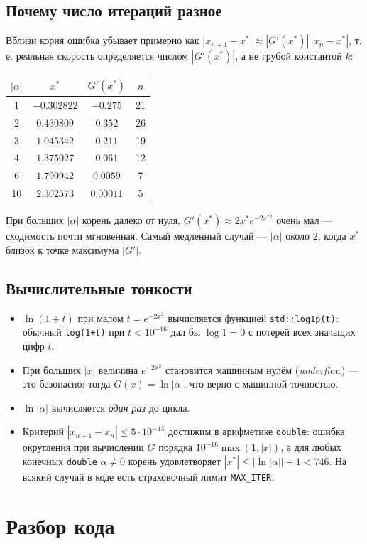 \documentclass[11pt,a4paper]{article}
\begin{document}
\subsection{Почему число итераций разное}
Вблизи корня ошибка убывает примерно как $|x_{n+1}-x^*|\approx|G'(x^*)|\,|x_n-x^*|$, т.\,е. реальная скорость определяется числом $|G'(x^*)|$, а не грубой константой $k$:
\begin{center}
\begin{tabular}{c|c|c|c}
$|\alpha|$ & $x^*$ & $G'(x^*)$ & $n$\\\hline
1 & $-0.302822$ & $-0.275$ & 21\\
2 & $0.430809$ & $0.352$ & 26\\
3 & $1.045342$ & $0.211$ & 19\\
4 & $1.375027$ & $0.061$ & 12\\
6 & $1.790942$ & $0.0059$ & 7\\
10 & $2.302573$ & $0.00011$ & 5
\end{tabular}
\end{center}
При больших $|\alpha|$ корень далеко от нуля, $G'(x^*)\approx 2x^*e^{-2x^{*2}}$ очень мал — сходимость почти мгновенная.
Самый медленный случай — $|\alpha|$ около $2$, когда $x^*$ близок к точке максимума $|G'|$.

\subsection{Вычислительные тонкости}
\begin{itemize}
\item $\ln(1+t)$ при малом $t=e^{-2x^2}$ вычисляется функцией \texttt{std::log1p(t)}: обычный \texttt{log(1+t)} при $t<10^{-16}$ дал бы $\log 1=0$ с потерей всех значащих цифр $t$.
\item При больших $|x|$ величина $e^{-2x^2}$ становится машинным нулём (\emph{underflow}) — это безопасно: тогда $G(x)=\ln|\alpha|$, что верно с машинной точностью.
\item $\ln|\alpha|$ вычисляется \emph{один раз} до цикла.
\item Критерий $|x_{n+1}-x_n|\le5\cdot10^{-13}$ достижим в арифметике \texttt{double}: ошибка округления при вычислении $G$ порядка $10^{-16}\max(1,|x|)$, а для любых конечных \texttt{double} $\alpha\ne0$ корень удовлетворяет $|x^*|\le|\ln|\alpha||+1<746$. На всякий случай в коде есть страховочный лимит \texttt{MAX\_ITER}.
\end{itemize}

\section{Разбор кода}
\end{document}
